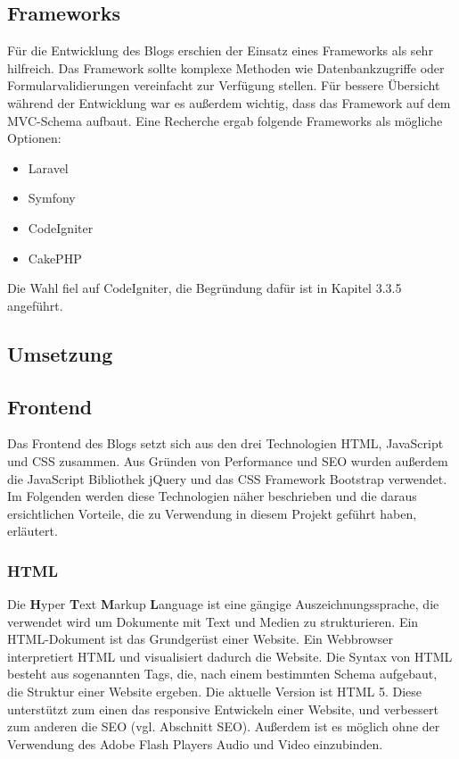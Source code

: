     \subsection*{Frameworks}
    Für die Entwicklung des Blogs erschien der Einsatz eines Frameworks als sehr hilfreich. Das Framework sollte komplexe Methoden wie
    Datenbankzugriffe oder Formularvalidierungen vereinfacht zur Verfügung stellen. Für bessere Übersicht während der Entwicklung war es außerdem
    wichtig, dass das Framework auf dem MVC-Schema aufbaut. Eine Recherche ergab folgende Frameworks als mögliche
    Optionen:

    \begin{itemize}
      \item Laravel
      \item Symfony
      \item CodeIgniter
      \item CakePHP
    \end{itemize}

    Die Wahl fiel auf CodeIgniter, die Begründung dafür ist in Kapitel 3.3.5 angeführt.

  \subsection{Umsetzung}

    \subsection*{Frontend}
    Das Frontend des Blogs setzt sich aus den drei Technologien HTML, JavaScript und CSS zusammen. Aus Gründen von Performance und SEO wurden außerdem
    die JavaScript Bibliothek jQuery und das CSS Framework Bootstrap verwendet. Im Folgenden werden diese Technologien näher beschrieben und die daraus
    ersichtlichen Vorteile, die zu Verwendung in diesem Projekt geführt haben, erläutert.

      \subsubsection*{HTML}
      Die {\textbf{H}yper \textbf{T}ext \textbf{M}arkup \textbf{L}anguage\cite{html}} ist eine gängige Auszeichnungssprache, die verwendet wird um Dokumente mit Text und Medien zu strukturieren.
      Ein HTML-Dokument ist das Grundgerüst einer Website. Ein Webbrowser interpretiert
      HTML und visualisiert dadurch die Website. Die Syntax von HTML besteht aus sogenannten Tags, die, nach einem
      bestimmten Schema aufgebaut, die Struktur einer Website ergeben. Die aktuelle Version ist HTML 5. Diese unterstützt zum einen das responsive
      Entwickeln einer Website, und verbessert zum anderen die SEO (vgl. Abschnitt SEO). Außerdem ist es möglich ohne der Verwendung des Adobe Flash Players Audio und Video einzubinden.

